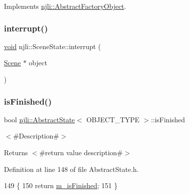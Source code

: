 Implements \mbox{\hyperlink{classnjli_1_1_abstract_factory_object_a207c86146d40d0794708ae7f2d4e60a7}{njli\+::\+Abstract\+Factory\+Object}}.

\mbox{\label{classnjli_1_1_scene_state_a6a733557c14d69103650485b239a9fc0}} 
\subsubsection{\texorpdfstring{interrupt()}{interrupt()}}
{\footnotesize\ttfamily \mbox{\hyperlink{_thread_8h_af1e856da2e658414cb2456cb6f7ebc66}{void}} njli\+::\+Scene\+State\+::interrupt (\begin{DoxyParamCaption}\item[{\mbox{\hyperlink{classnjli_1_1_scene}{Scene}} $\ast$}]{object }\end{DoxyParamCaption})}

\mbox{\label{classnjli_1_1_scene_state_a4c7007210237496fbe169ba114c3750d}} 
\subsubsection{\texorpdfstring{is\+Finished()}{isFinished()}}
{\footnotesize\ttfamily bool \mbox{\hyperlink{classnjli_1_1_abstract_state}{njli\+::\+Abstract\+State}}$<$ O\+B\+J\+E\+C\+T\+\_\+\+T\+Y\+PE $>$\+::is\+Finished}

$<$\#\+Description\#$>$

\begin{DoxyReturn}{Returns}
$<$\#return value description\#$>$ 
\end{DoxyReturn}


Definition at line 148 of file Abstract\+State.\+h.


\begin{DoxyCode}
149   \{
150     \textcolor{keywordflow}{return} \mbox{\hyperlink{classnjli_1_1_abstract_state_a445a5d1ac7572b8b01b81937c89e960c}{m\_isFinished}};
151   \}
\end{DoxyCode}
\mbox{\label{classnjli_1_1_scene_state_a4fb86e98a2622bf121bc8da38669307c}} 
